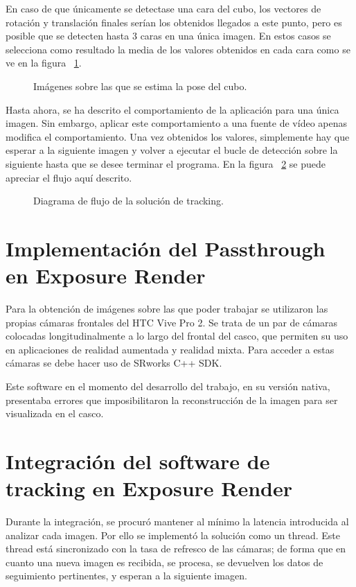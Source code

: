 En caso de que únicamente se detectase una cara del cubo, los vectores de rotación y translación finales serían los obtenidos llegados a este punto, pero es posible que se detecten hasta 3 caras en una única imagen. En estos casos se selecciona como resultado la media de los valores obtenidos en cada cara como se ve en la figura \figurename~\ref{fig:cubo_detected}.

\begin{figure}%
    \centering
    \qquad
    \caption{Imágenes sobre las que se estima la pose del cubo.}%
    \label{fig:cubo_detected}%
\end{figure}

Hasta ahora, se ha descrito el comportamiento de la aplicación para una única imagen. Sin embargo, aplicar este comportamiento a una fuente de vídeo apenas modifica el comportamiento. Una vez obtenidos los valores, simplemente hay que esperar a la siguiente imagen y volver a ejecutar el bucle de detección sobre la siguiente hasta que se desee terminar el programa. En la figura \figurename~\ref{fig:flujo_tfg} se puede apreciar el flujo aquí descrito.

\begin{figure}
  \centering
  
  \caption{Diagrama de flujo de la solución de tracking.}
  \label{fig:flujo_tfg}
\end{figure}



\section{Implementación del Passthrough en Exposure Render}
Para la obtención de imágenes sobre las que poder trabajar se utilizaron las propias cámaras frontales del HTC Vive Pro 2. Se trata de un par de cámaras colocadas longitudinalmente a lo largo del frontal del casco, que permiten su uso en aplicaciones de realidad aumentada y realidad mixta. 
Para acceder a estas cámaras se debe hacer uso de SRworks C++ SDK.

Este software en el momento del desarrollo del trabajo, en su versión nativa, presentaba errores que imposibilitaron la reconstrucción de la imagen para ser visualizada en el casco.
\section{Integración del software de tracking en Exposure Render}
Durante la integración, se procuró mantener al mínimo la latencia introducida al analizar cada imagen. Por ello se implementó la solución como un thread. Este thread está sincronizado con la tasa de refresco de las cámaras; de forma que en cuanto una nueva imagen es recibida, se procesa, se devuelven los datos de seguimiento pertinentes, y esperan a la siguiente imagen.